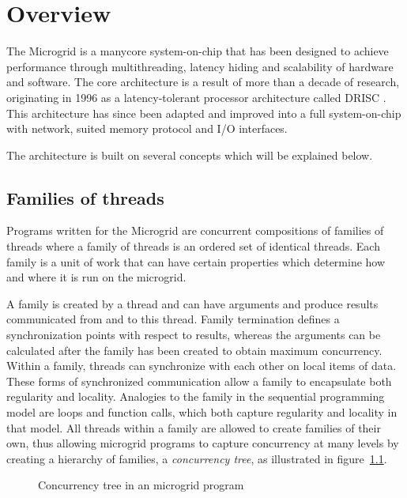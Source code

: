 \chapter{Overview}

The Microgrid is a manycore system-on-chip that has been designed to achieve performance through multithreading, latency hiding and scalability of hardware and software. The core architecture is a result of more than a decade of research, originating in 1996 as a latency-tolerant processor architecture called DRISC \cite{DRISC96}. This architecture has since been adapted and improved into a full system-on-chip with network, suited memory protocol and I/O interfaces.

The architecture is built on several concepts \cite{ILP06} which will be explained below.

\section{Families of threads}

Programs written for the Microgrid are concurrent compositions of families of threads where a family of threads is an ordered set of identical threads. Each family is a unit of work that can have certain properties which determine how and where it is run on the microgrid.

A family is created by a thread and can have arguments and produce results communicated from and to this thread. Family termination defines a synchronization points with respect to results, whereas the arguments can be calculated after the family has been created to obtain maximum concurrency. Within a family, threads can synchronize with each other on local items of data. These forms of synchronized communication allow a family to encapsulate both regularity and locality. Analogies to the family in the sequential programming model are loops and function calls, which both capture regularity and locality in that model. All threads within a family are allowed to create families of their own, thus allowing microgrid programs to capture concurrency at many levels by creating a hierarchy of families, a \emph{concurrency tree}, as illustrated in figure~\ref{fig:concurrency-tree}.

\begin{figure}
 \begin{center}
  
  \caption{Concurrency tree in an microgrid program}
  \label{fig:concurrency-tree}
 \end{center}
\end{figure}

